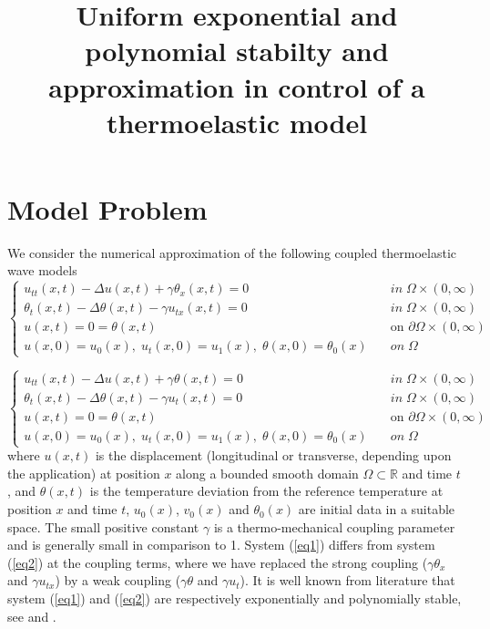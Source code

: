 \documentclass [reqno]{amsart}
\title[{\tiny Uniform exponential and polynomial stabilty and approximation in control of a thermoelastic model}]{
 \bf Uniform exponential and polynomial stabilty and approximation in control of a thermoelastic model}
\date{}
\begin{document}
\maketitle
{}
\newtheorem{thm}{Theorem}[section]
\newtheorem{lem}{Lemma}[section]
\newtheorem{prop}{Proposition}[section]
\newtheorem{Def}{Definition}[section]
\newtheorem{rmk}{Remark}[section]
\newenvironment{dem}{\noindent\textbf{Proof.~}}{\hfill$\square$\bigbreak}

\section*{\bf Model Problem}
We consider the numerical approximation of the following coupled thermoelastic wave models
\begin{equation}
\label{eq1}
\tag{1}
 \left\{\begin{array}{llll}
                      u_{tt}(x,t)- \Delta u(x,t)+\gamma\theta_x(x,t)=0\quad &in\;\Omega\times(0, \infty)\\
		      \theta_{t}(x,t)-\Delta\theta(x,t)-\gamma u_{tx}(x,t) =0\quad &in\;\Omega\times(0, \infty)\\
		      u(x,t)=0=\theta(x,t)\qquad &\text{on } \partial\Omega\times(0,\infty)\\
u(x,0)=u_{0}(x),\; u_{t}(x,0)=u_{1}(x),\; \theta(x,0)=\theta_{0}(x) \quad &on \;\Omega
                     \end{array}
                   \right.
\end{equation}

\begin{equation}
\label{eq2}
\tag{2}
 \left\{\begin{array}{llll}
                      u_{tt}(x,t)- \Delta u(x,t)+\gamma\theta(x,t)=0\quad &in\;\Omega\times(0, \infty)\\
		      \theta_{t}(x,t)-\Delta\theta(x,t)-\gamma u_{t}(x,t) =0\quad &in\;\Omega\times(0, \infty)\\
		      u(x,t)=0=\theta(x,t)\qquad &\text{on } \partial\Omega\times(0,\infty)\\
u(x,0)=u_{0}(x),\; u_{t}(x,0)=u_{1}(x),\; \theta(x,0)=\theta_{0}(x) \quad &on \;\Omega
                     \end{array}
                   \right.
\end{equation}
where $u(x,t)$ is the displacement (longitudinal or transverse, depending upon the application) at position $x$ along a bounded smooth domain $\Omega\subset\mathbb{R}$ and time $t$ , and $\theta(x,t)$ is the temperature deviation from the reference temperature at position $x$ and time $t$, $u_0(x)$, $v_0(x)$ and $\theta_0(x)$ are initial data in a suitable space. The small positive constant $\gamma$ is a thermo-mechanical coupling parameter and is generally small in comparison to 1. System (\ref{eq1}) differs from system (\ref{eq2}) at the coupling terms, where we have replaced the strong coupling ($\gamma\theta_x$ and $\gamma u_{tx}$) by a weak coupling ($\gamma\theta$ and $\gamma u_{t}$).
It is well known from literature that system (\ref{eq1}) and (\ref{eq2}) are respectively exponentially and polynomially stable, see \cite{Hansen1992, LZb1993} and \cite{KBT1997, KBB1999, LR2005}.
\end{document}
